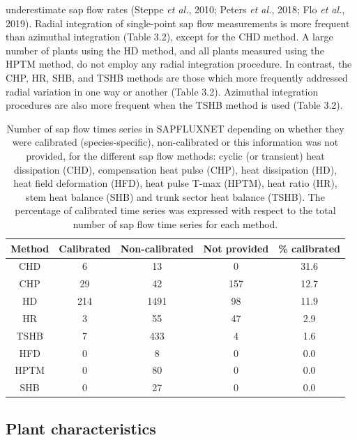 \documentclass[11pt,twoside]{reedthesis}
\begin{document}
underestimate sap flow rates (Steppe \emph{et al.}, 2010; Peters
\emph{et al.}, 2018; Flo \emph{et al.}, 2019). Radial integration of
single-point sap flow measurements is more frequent than azimuthal
integration (Table 3.2), except for the CHD method. A large number of
plants using the HD method, and all plants measured using the HPTM
method, do not employ any radial integration procedure. In contrast, the
CHP, HR, SHB, and TSHB methods are those which more frequently addressed
radial variation in one way or another (Table 3.2). Azimuthal
integration procedures are also more frequent when the TSHB method is
used (Table 3.2).\par
\vspace*{1cm}
\begin{table}[!h]

\caption[Number of sap flow times series in SAPFLUXNET depending on whether they were calibrated for the different sap flow methods.]{\label{tab:Ch3T1}Number of sap flow times series in SAPFLUXNET depending on whether they were calibrated (species-specific), non-calibrated or this information was not provided, for the different sap flow methods: cyclic (or transient) heat dissipation (CHD), compensation heat pulse (CHP), heat dissipation (HD), heat field deformation (HFD), heat pulse T-max (HPTM), heat ratio (HR), stem heat balance (SHB) and trunk sector heat balance (TSHB). The percentage of calibrated time series was expressed with respect to the total number of sap flow time series for each method.}
\centering
\fontsize{10}{12}\selectfont
\begin{tabular}[t]{ccccc}
\toprule
Method & Calibrated & Non-calibrated & Not provided & \% calibrated\\
\midrule
CHD & 6 & 13 & 0 & 31.6\\
CHP & 29 & 42 & 157 & 12.7\\
HD & 214 & 1491 & 98 & 11.9\\
HR & 3 & 55 & 47 & 2.9\\
TSHB & 7 & 433 & 4 & 1.6\\
HFD & 0 & 8 & 0 & 0.0\\
HPTM & 0 & 80 & 0 & 0.0\\
SHB & 0 & 27 & 0 & 0.0\\
\bottomrule
\end{tabular}
\end{table}
\subsection{Plant characteristics}\label{plant-characteristics}
\end{document}
